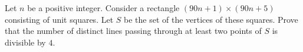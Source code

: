 Let $ n$ be a positive integer. Consider a rectangle $ (90n+1)\times(90n+5)$ consisting of unit squares. Let $ S$ be the set of the vertices of these squares. Prove that the number of distinct lines passing through at least two points of $ S$ is divisible by $ 4$.